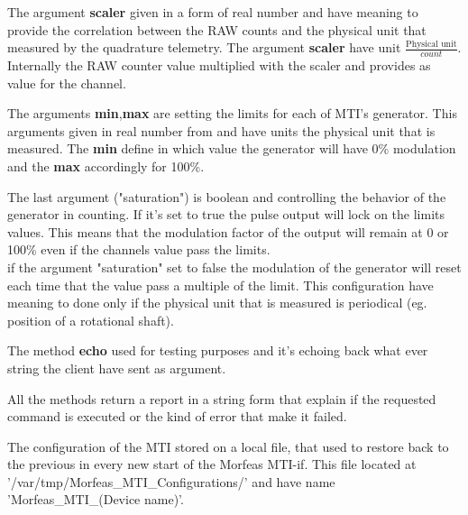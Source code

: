 The argument \textbf{scaler} given in a form of real number and have meaning to provide the correlation between the RAW counts and the physical unit that measured by the quadrature telemetry.
The argument \textbf{scaler} have unit $\displaystyle\frac{\text{Physical unit}}{count}$. Internally the RAW counter value multiplied with the scaler and provides as value for the channel.

The arguments \textbf{min},\textbf{max} are setting the limits for each of MTI's generator. This arguments given in real number from and have units the physical unit that is measured.
The \textbf{min} define in which value the generator will have 0\% modulation and the \textbf{max} accordingly for 100\%.

The last argument ("saturation") is boolean and controlling the behavior of the generator in counting. If it's set to true the pulse output will lock on the limits values.
This means that the modulation factor of the output will remain at 0 or 100\% even if the channels value pass the limits.\\
if the argument "saturation" set to false the modulation of the generator will reset each time that the value pass a multiple of the limit. This configuration have meaning to done
only if the physical unit that is measured is periodical (eg. position of a rotational shaft).

The method \textbf{echo} used for testing purposes and it's echoing back what ever string the client have sent as argument.

All the methods return a report in a string form that explain if the requested command is executed or the kind of error that make it failed.

The configuration of the MTI stored on a local file, that used to restore back to the previous in every new start of the Morfeas MTI-if.
This file located at '/var/tmp/Morfeas\_MTI\_Configurations/' and have name 'Morfeas\_MTI\_(Device name)'.
